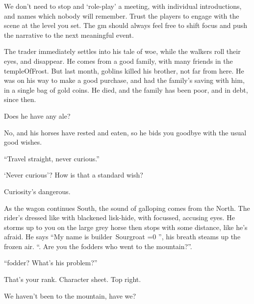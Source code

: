\begin{multicols}{2}
\bigLine
\vspace{2em}

\noindent
We don't need to stop and `role-play' a meeting, with individual introductions, and  names which nobody will remember.
Trust the players to engage with the scene at the level you set.
  The \gls{gm} should always feel free to shift focus and push the narrative to the next meaningful event.

\bigLine

\begin{description}\sf
  \item[\Glsentrytext{gm}:]
  The trader immediately settles into his tale of woe, while the walkers roll their eyes, and disappear.
  He comes from a good family, with many friends in the \gls{templeOfFrost}.
  But last month, goblins killed his brother, not far from here.
  He was on his way to make a good purchase, and had the family's saving with him, in a single bag of gold coins.
  He died, and the family has been poor, and in debt, since then.
  \item[Player 2:]
  Does he have any ale?
  \item[\Glsentrytext{gm}:]
  No, and his horses have rested and eaten, so he bids you goodbye with the usual good wishes.

  ``Travel straight, never curious.''
  \item[Player 2:]
  `Never curious'?
  How is that a standard wish?
  \item[Player 1:]
  Curiosity's dangerous.
  \item[\Glsentrytext{gm}:]
  As the wagon continues South, the sound of galloping comes from the North.
  The rider's dressed like  with blackened lisk-hide, with focussed, accusing eyes.
  He storms up to you on the large grey horse then stops with some distance, like he's afraid.
  He says ``My name is \Gls{builder}~Sourgroat%
  \ifnum\value{temperature}=0 '', his breath steams up the frozen air.
  ``\else.\fi
  Are you the \glspl{fodder} who went to the mountain?''.
  \item[Player 2:]
  ``\Gls{fodder}?
  What's his problem?''
  \item[Player 1:]
  That's your rank.
  Character sheet.
  Top right.

  We haven't been to the mountain, have we?


\end{description}
\end{multicols}
